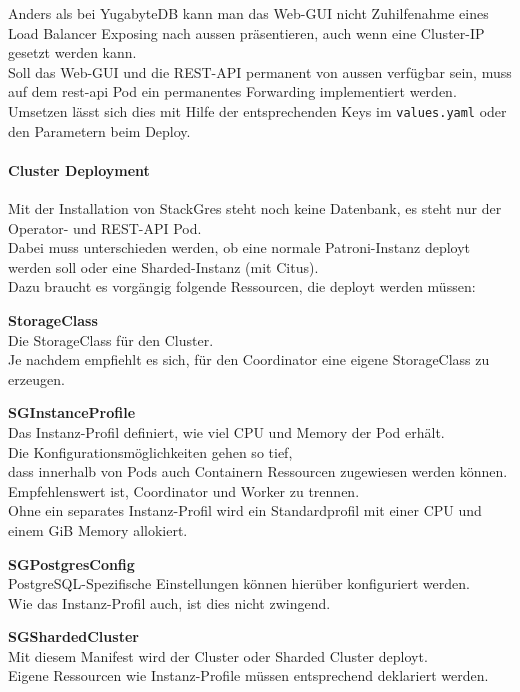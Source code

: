 \begin{flushleft}
    Anders als bei YugabyteDB kann man das Web-GUI nicht Zuhilfenahme eines Load Balancer Exposing nach aussen präsentieren, auch wenn eine Cluster-IP gesetzt werden kann.\\
    Soll das Web-GUI und die REST-API permanent von aussen verfügbar sein, muss auf dem rest-api Pod ein permanentes Forwarding implementiert werden.\\
    Umsetzen lässt sich dies mit Hilfe der entsprechenden Keys im \texttt{values.yaml} oder den Parametern beim Deploy.
\end{flushleft}
\begin{flushleft}
    \paragraph{Cluster Deployment}
    Mit der Installation von StackGres steht noch keine Datenbank, es steht nur der Operator- und REST-API Pod.\\
    Dabei muss unterschieden werden, ob eine normale Patroni-Instanz deployt werden soll oder eine Sharded-Instanz (mit Citus).\\
    Dazu braucht es vorgängig folgende Ressourcen, die deployt werden müssen:\\
    \begin{description}
        \item \textbf{StorageClass}\hfill \\Die StorageClass für den Cluster.\\Je nachdem empfiehlt es sich, für den Coordinator eine eigene StorageClass zu erzeugen.
        \item \textbf{SGInstanceProfile}\hfill \\Das Instanz-Profil definiert, wie viel CPU und Memory der Pod erhält.\\Die Konfigurationsmöglichkeiten gehen so tief,\\dass innerhalb von Pods auch Containern Ressourcen zugewiesen werden können.\\ Empfehlenswert ist, Coordinator und Worker zu trennen.\\Ohne ein separates Instanz-Profil wird ein Standardprofil mit einer CPU und einem GiB Memory allokiert.
        \item \textbf{SGPostgresConfig}\hfill \\PostgreSQL-Spezifische Einstellungen können hierüber konfiguriert werden.\\Wie das Instanz-Profil auch, ist dies nicht zwingend.
        \item \textbf{SGShardedCluster}\hfill \\Mit diesem Manifest wird der Cluster oder Sharded Cluster deployt.\\Eigene Ressourcen wie Instanz-Profile müssen entsprechend deklariert werden.
    \end{description}
\end{flushleft}

